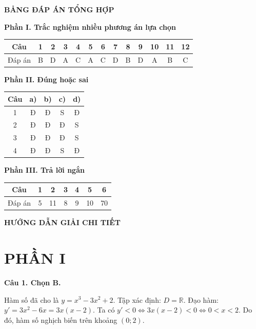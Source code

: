 \documentclass[12pt,a4paper]{article}
\newcommand{\loigiai}[1]{\par\medskip\Needspace{4\baselineskip}\noindent\textbf{#1}\par\nobreak}
\begin{document}
\newpage\pagestyle{answers}
\begin{center}\Large\textbf{BẢNG ĐÁP ÁN TỔNG HỢP}\end{center}
\textbf{Phần I. Trắc nghiệm nhiều phương án lựa chọn}
\begin{center}
\renewcommand{\arraystretch}{1.5}
\begin{tabular}{|c|*{12}{c|}}\hline
Câu & 1&2&3&4&5&6&7&8&9&10&11&12\\\hline
Đáp án & B & D & A & C & A & C & D & B & D & A & B & C \\\hline
\end{tabular}
\end{center}

\textbf{Phần II. Đúng hoặc sai}
\begin{center}
\renewcommand{\arraystretch}{1.4}
\begin{tabular}{|c|c|c|c|c|}\hline
Câu & a) & b) & c) & d)\\\hline
1 & Đ & Đ & S & Đ\\\hline
2 & Đ & Đ & Đ & S\\\hline
3 & Đ & Đ & Đ & S\\\hline
4 & Đ & Đ & S & Đ\\\hline
\end{tabular}
\end{center}

\textbf{Phần III. Trả lời ngắn}
\begin{center}
\renewcommand{\arraystretch}{1.5}
\begin{tabular}{|c|c|c|c|c|c|c|}\hline
Câu & 1 & 2 & 3 & 4 & 5 & 6\\\hline
Đáp án & 5 & 11 & 8 & 9 & 10 & 70 \\\hline
\end{tabular}
\end{center}

\vspace{0.5cm}
\begin{center}
\large\textbf{HƯỚNG DẪN GIẢI CHI TIẾT}
\end{center}

\section*{PHẦN I}

\loigiai{Câu 1. Chọn B.}
Hàm số đã cho là $y=x^3-3x^2+2$.
Tập xác định: $D=\mathbb{R}$.
Đạo hàm: $y'=3x^2-6x=3x(x-2)$.
Ta có $y'<0 \iff 3x(x-2)<0 \iff 0<x<2$.
Do đó, hàm số nghịch biến trên khoảng $(0;2)$.
\end{document}
